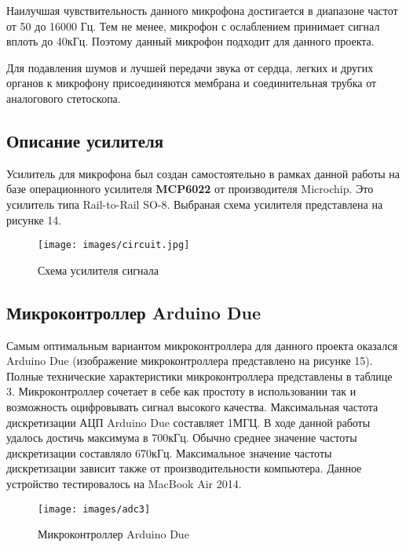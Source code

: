 \documentclass[../main.tex]{subfiles}
\begin{document}
Наилучшая чувствительность данного микрофона достигается в диапазоне частот от 50 до 16000 Гц. Тем не менее, микрофон с ослаблением принимает сигнал вплоть до 40кГц. Поэтому данный микрофон подходит для данного проекта.

Для подавления шумов и лучшей передачи звука от сердца, легких и других органов к микрофону присоединяются мембрана и соединительная трубка от аналогового стетоскопа.

\subsection{Описание усилителя}
Усилитель для микрофона был создан самостоятельно в рамках данной работы на базе операционного усилителя \textbf{MCP6022} от производителя Microchip. Это усилитель типа Rail-to-Rail SO-8. Выбраная схема усилителя представлена на рисунке 14.

\begin{figure}[H]
\centering
\texttt{[image: images/circuit.jpg]}
\caption{Схема усилителя сигнала}
\end{figure}

\subsection{Микроконтроллер Arduino Due}
Самым оптимальным вариантом микроконтроллера для данного проекта оказался Arduino Due (изображение микроконтроллера представлено на рисунке 15). Полные технические характеристики микроконтроллера представлены в таблице 3. Микроконтроллер сочетает в себе как простоту в использовании так и возможность оцифровывать сигнал высокого качества. Максимальная частота дискретизации АЦП Arduino Due составляет 1МГЦ. В ходе данной работы удалось достичь максимума в 700кГц. Обычно среднее значение частоты дискретизации составляло 670кГц. Максимальное значение частоты дискретизации зависит также от производительности компьютера. Данное устройство тестировалось на MacBook Air 2014.

\begin{figure}[H]
\centering
\texttt{[image: images/adc3]}
\caption{Микроконтроллер Arduino Due}
\end{figure}
\end{document}
